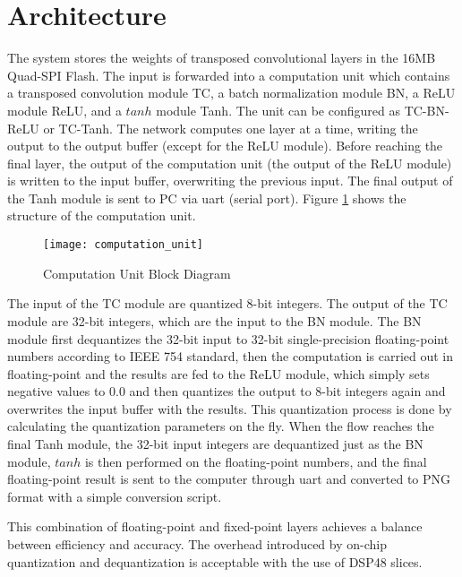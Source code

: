 \section{Architecture}

The system stores the weights of transposed convolutional layers in the 16MB Quad-SPI Flash. The input is
forwarded into a computation unit which contains a transposed convolution module TC,
a batch normalization module BN, a ReLU module ReLU, and a $tanh$ module Tanh.
The unit can be configured as TC-BN-ReLU or TC-Tanh. The network computes one
layer at a time, writing the output to the output buffer (except for the ReLU module). Before reaching the final layer, the output of
the computation unit (the output of the ReLU module) is written to the input buffer, overwriting the previous input. The final output of the Tanh module is
sent to PC via \gls{uart} (serial port). Figure \ref{fig:computation_unit} shows the structure of the
computation unit.

\begin{figure}[h]
  \centering
  \texttt{[image: computation\_unit]}
  \caption{Computation Unit Block Diagram}
  \label{fig:computation_unit}
\end{figure}

The input of the TC module are quantized 8-bit integers. The output of the TC module are 32-bit
integers, which are the input to the BN module. The BN module first dequantizes the 32-bit input to 32-bit
single-precision floating-point numbers according to IEEE 754 standard, then the computation is carried
out in floating-point and the results are fed to the ReLU module, which simply sets negative values to
$0.0$ and then quantizes the output to 8-bit integers again and overwrites the input buffer with the
results. This quantization process is done by calculating the quantization parameters on the fly.
When the flow reaches the final Tanh module, the 32-bit input integers are dequantized just as the
BN module, $tanh$ is then performed on the floating-point numbers, and the final floating-point result is
sent to the computer through \gls{uart} and converted to PNG format with a simple conversion script.

This combination of floating-point and fixed-point layers achieves a balance between efficiency and
accuracy. The overhead introduced by on-chip quantization and dequantization is acceptable with the
use of DSP48 slices.

\clearpage %
